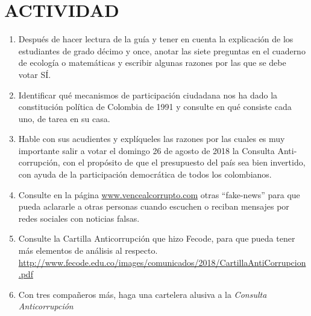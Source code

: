 \documentclass[twoside]{article}
\begin{document}
\section*{ACTIVIDAD}
\begin{enumerate}
\item Después de hacer lectura de la guía y tener en cuenta la explicación de los estudiantes de grado décimo y once, anotar las siete preguntas en el cuaderno de ecología  o matemáticas y escribir algunas razones por las que se debe votar SÍ.
\item Identificar qué mecanismos de participación  ciudadana nos ha dado la constitución política de Colombia de 1991 y consulte en qué consiste cada uno, de tarea en su casa.
\item Hable con sus acudientes y explíqueles las razones por las cuales es muy importante salir a votar el domingo 26 de agosto de 2018 la Consulta Anti-corrupción, con el propósito de que el presupuesto del país sea bien invertido, con ayuda de la participación democrática de todos los colombianos.
\item Consulte en la página \url{www.vencealcorrupto.com} otras ``fake-news'' para que pueda aclararle a otras personas cuando escuchen o reciban mensajes por redes sociales con noticias falsas.
\item Consulte la Cartilla Anticorrupción que hizo Fecode, para que pueda tener más elementos de análisis al respecto. \url{http://www.fecode.edu.co/images/comunicados/2018/CartillaAntiCorrupcion.pdf}
\item Con tres compañeros más, haga una cartelera alusiva a la \emph{Consulta Anticorrupción}
\end{enumerate}
\end{document}
